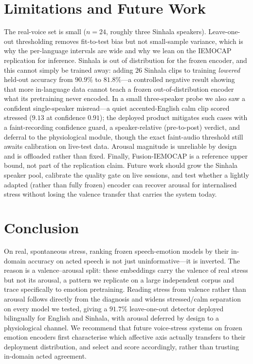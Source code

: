 \documentclass[conference]{IEEEtran}
\begin{document}
\section{Limitations and Future Work}
The real-voice set is small ($n = 24$, roughly three Sinhala speakers).
Leave-one-out thresholding removes fit-to-test bias but not small-sample variance,
which is why the per-language intervals are wide and why we lean on the IEMOCAP
replication for inference. Sinhala is out of distribution for the frozen encoder,
and this cannot simply be trained away: adding $26$ Sinhala clips to training
\emph{lowered} held-out accuracy from $90.9\%$ to $81.8\%$---a controlled negative
result showing that more in-language data cannot teach a frozen out-of-distribution
encoder what its pretraining never encoded. In a small three-speaker probe we also
saw a confident single-speaker misread---a quiet accented-English calm clip scored
stressed ($9.13$ at confidence $0.91$); the deployed product mitigates such cases
with a faint-recording confidence guard, a speaker-relative (pre-to-post) verdict,
and deferral to the physiological module, though the exact faint-audio threshold
still awaits calibration on live-test data. Arousal magnitude is unreliable by
design and is offloaded rather than fixed. Finally, Fusion-IEMOCAP is a reference
upper bound, not part of the replication claim. Future work should grow the Sinhala
speaker pool, calibrate the quality gate on live sessions, and test whether a
lightly adapted (rather than fully frozen) encoder can recover arousal for
internalised stress without losing the valence transfer that carries the system
today.

\section{Conclusion}
On real, spontaneous stress, ranking frozen speech-emotion models by their
in-domain accuracy on acted speech is not just uninformative---it is inverted. The
reason is a valence--arousal split: these embeddings carry the valence of real
stress but not its arousal, a pattern we replicate on a large independent corpus
and trace specifically to emotion pretraining. Reading stress from valence rather
than arousal follows directly from the diagnosis and widens stressed/calm
separation on every model we tested, giving a $91.7\%$ leave-one-out detector
deployed bilingually for English and Sinhala, with arousal deferred by design to a
physiological channel. We recommend that future voice-stress systems on frozen
emotion encoders first characterise which affective axis actually transfers to
their deployment distribution, and select and score accordingly, rather than
trusting in-domain acted agreement.



\end{document}
